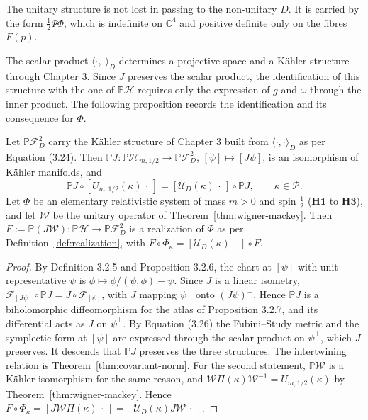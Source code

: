 \noindent The unitary structure is not lost in passing to the non-unitary $D$. It is carried by the form $\tfrac12\bar{\Psi}\Phi$, which is indefinite on $\mathbb{C}^4$ and positive definite only on the fibres $F(p)$.

The scalar product $\langle\cdot,\cdot\rangle_D$ determines a projective space and a Kähler structure through Chapter 3. Since $J$ preserves the scalar product, the identification of this structure with the one of $\mathbb{P}\mathcal{H}$ requires only the expression of $g$ and $\omega$ through the inner product. The following proposition records the identification and its consequence for $\Phi$.

\begin{proposition}\label{prop:kahler-dirac}
	Let $\mathbb{P}\mathcal{F}_D^2$ carry the Kähler structure of Chapter 3 built from $\langle\cdot,\cdot\rangle_D$ as per Equation (3.24). Then $\mathbb{P}J:\mathbb{P}\mathcal{H}_{m,1/2}\to\mathbb{P}\mathcal{F}_D^2$, $[\psi]\mapsto[J\psi]$, is an isomorphism of Kähler manifolds, and
	\begin{equation*}
		\mathbb{P}J\circ[U_{m,1/2}(\kappa)\,\cdot\,]=[\mathcal{U}_D(\kappa)\,\cdot\,]\circ\mathbb{P}J,\qquad \kappa\in\mathcal{P}.
	\end{equation*}
	Let $\Phi$ be an elementary relativistic system of mass $m>0$ and spin $\tfrac12$ ($\mathbf{H1}$ to $\mathbf{H3}$), and let $\mathcal{W}$ be the unitary operator of Theorem~\ref{thm:wigner-mackey}. Then $F:=\mathbb{P}(J\mathcal{W}):\mathbb{P}\mathcal{H}\to\mathbb{P}\mathcal{F}_D^2$ is a realization of $\Phi$ as per Definition~\ref{def:realization}, with $F\circ\Phi_\kappa=[\mathcal{U}_D(\kappa)\,\cdot\,]\circ F$.
\end{proposition}

\begin{proof}
	By Definition 3.2.5 and Proposition 3.2.6, the chart at $[\psi]$ with unit representative $\psi$ is $\phi\mapsto\phi/(\psi,\phi)-\psi$. Since $J$ is a linear isometry, $\mathcal{F}_{[J\psi]}\circ\mathbb{P}J=J\circ\mathcal{F}_{[\psi]}$, with $J$ mapping $\psi^\perp$ onto $(J\psi)^\perp$. Hence $\mathbb{P}J$ is a biholomorphic diffeomorphism for the atlas of Proposition 3.2.7, and its differential acts as $J$ on $\psi^\perp$. By Equation (3.26) the Fubini--Study metric and the symplectic form at $[\psi]$ are expressed through the scalar product on $\psi^\perp$, which $J$ preserves. It descends that $\mathbb{P}J$ preserves the three structures. The intertwining relation is Theorem~\ref{thm:covariant-norm}. For the second statement, $\mathbb{P}\mathcal{W}$ is a Kähler isomorphism for the same reason, and $\mathcal{W}\Pi(\kappa)\mathcal{W}^{-1}=U_{m,1/2}(\kappa)$ by Theorem~\ref{thm:wigner-mackey}. Hence $F\circ\Phi_\kappa=[J\mathcal{W}\Pi(\kappa)\,\cdot\,]=[\mathcal{U}_D(\kappa)J\mathcal{W}\,\cdot\,]$.
\end{proof}

